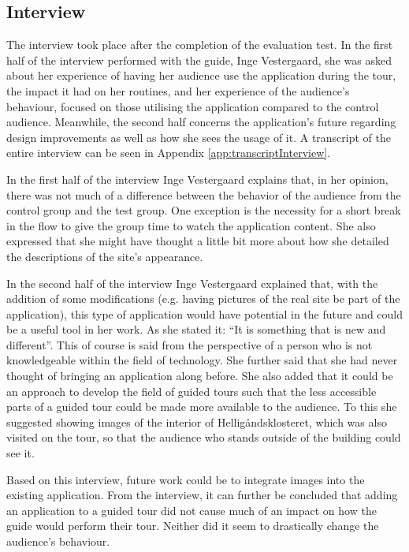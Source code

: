 \subsection{Interview}
The interview took place after the completion of the evaluation test. In the first half of the interview performed with the guide, Inge Vestergaard, she was asked about her experience of having her audience use the application during the tour, the impact it had on her routines, and her experience of the audience’s behaviour, focused on those utilising the application compared to the control audience. Meanwhile, the second half concerns the application’s future regarding design improvements as well as how she sees the usage of it. A transcript of the entire interview can be seen in Appendix \ref{app:transcriptInterview}.

In the first half of the interview Inge Vestergaard explains that, in her opinion, there was not much of a difference between the behavior of the audience from the control group and the test group. One exception is the necessity for a short break in the flow to give the group time to watch the application content. She also expressed that she might have thought a little bit more about how she detailed the descriptions of the site’s appearance.     

In the second half of the interview Inge Vestergaard explained that, with the addition of some modifications (e.g. having pictures of the real site be part of the application), this type of application would have potential in the future and could be a useful tool in her work. As she stated it: “It is something that is new and different”. This of course is said from the perspective of a person who is not knowledgeable within the field of technology. She further said that she had never thought of bringing an application along before. She also added that it could be an approach to develop the field of guided tours such that the less accessible parts of a guided tour could be made more available to the audience. To this she suggested showing images of the interior of Helligåndsklosteret, which was also visited on the tour, so that the audience who stands outside of the building could see it.

Based on this interview, future work could be to integrate images into the existing application. From the interview, it can further be concluded that adding an application to a guided tour did not cause much of an impact on how the guide would perform their tour. Neither did it seem to drastically change the audience’s behaviour. 

